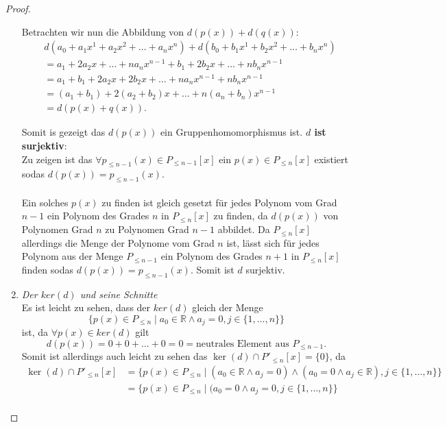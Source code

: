 \documentclass{../problemset}
\begin{document}
\begin{problem}
\begin{proof}
\begin{enumerate}
		      Betrachten wir nun die Abbildung von $d(p(x)) + d(q(x))$: \begin{align}
			       & d(a_0 + a_1x^1 + a_2x^2 + \ldots + a_nx^n) + d(b_0 + b_1x^1 + b_2x^2 + \ldots + b_nx^n) \\
			       & = a_1 + 2a_2x + \ldots + na_nx^{n-1} + b_1 + 2b_2x + \ldots + nb_nx^{n-1}               \\
			       & = a_1 + b_1 + 2a_2x + 2b_2x + \ldots + na_nx^{n-1} + nb_nx^{n-1}                        \\
			       & = (a_1 + b_1) + 2(a_2 + b_2)x + \ldots + n(a_n+b_n)x^{n-1}                              \\
			       & = d(p(x) + q(x)).
		      \end{align}

		      Somit is gezeigt das $d(p(x))$ ein Gruppenhomomorphismus ist.
		      \checkmark
		      \textbf{$d$ ist surjektiv}: \\
		      Zu zeigen ist das $\forall p_{\le n-1}(x) \in P_{\le n-1}[x]$ ein $p(x) \in P_{\le n}[x]$ existiert sodas $d(p(x)) = p_{\le n-1}(x)$.
		      \\\\
		      Ein solches $p(x)$ zu finden ist gleich gesetzt für jedes Polynom vom Grad $n-1$ ein Polynom des Grades $n$ in $P_{\le n}[x]$ zu finden,
		      da $d(p(x))$ von Polynomen Grad $n$ zu Polynomen Grad $n-1$ abbildet.
		      Da $P_{\le n}[x]$ allerdings die Menge der Polynome vom Grad $n$ ist,
		      lässt sich für jedes Polynom aus der Menge $P_{\le n - 1}$ ein Polynom des Grades $n+1$ in $P_{\le n}[x]$ finden sodas $d(p(x)) = p_{\le n -1}(x)$.
		      Somit ist $d$ surjektiv.
		      \checkmark
		\item \textit{Der $ker(d)$ und seine Schnitte} \\
		      Es ist leicht zu sehen, dass der $ker(d)$ gleich der Menge \[
			      \{p(x) \in P_{\le n} \mid a_0 \in \mathbb{R} \land a_j = 0, j \in \{1, \ldots, n\}\}
		      \] ist, da $\forall p(x) \in ker(d)$ gilt \[
			      d(p(x)) = 0 + 0 + \ldots + 0 = 0 = \text{neutrales Element aus } P_{\le n-1}.
		      \]
		      Somit ist allerdings auch leicht zu sehen das $\ker(d) \cap P'_{\le n}[x] = \{0\}$, da \begin{align}
			      \ker(d) \cap P'_{\le n}[x] & = \{p(x) \in P_{\le n} \mid (a_0 \in \mathbb{R} \land a_j = 0) \land (a_0 = 0 \land a_j \in \mathbb{R}), j \in \{1, \ldots, n\}\} \\
			                                 & = \{p(x) \in P_{\le n} \mid (a_0 = 0 \land a_j = 0, j \in \{1, \ldots, n\}\}                                                      \\

\end{align}
\end{enumerate}
\end{proof}
\end{problem}
\end{document}
